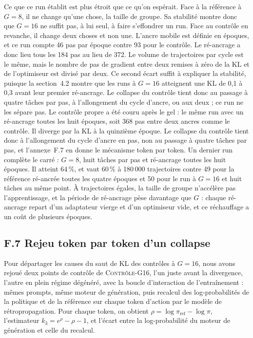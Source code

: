 \documentclass[11pt,a4paper]{article}
\begin{document}
Ce que ce run établit est plus étroit que ce qu'on espérait. Face à la référence à $G=8$, il ne change qu'une chose, la taille de groupe. Sa stabilité montre donc que $G=16$ ne suffit pas, à lui seul, à faire s'effondrer un run. Face au contrôle en revanche, il change deux choses et non une. L'ancre mobile est définie en époques, et ce run compte 46 pas par époque contre 93 pour le contrôle. Le ré-ancrage a donc lieu tous les 184 pas au lieu de 372. Le volume de trajectoires par cycle est le même, mais le nombre de pas de gradient entre deux remises à zéro de la KL et de l'optimiseur est divisé par deux. Ce second écart suffit à expliquer la stabilité, puisque la section~4.2 montre que les runs à $G=16$ atteignent une KL de 0{,}1 à 0{,}3 avant leur premier ré-ancrage. Le collapse du contrôle tient donc au passage à quatre tâches par pas, à l'allongement du cycle d'ancre, ou aux deux ; ce run ne les sépare pas. Le contrôle propre a été couru après le gel : le même run avec un ré-ancrage toutes les huit époques, soit 368 pas entre deux ancres comme le contrôle. Il diverge par la KL à la quinzième époque. Le collapse du contrôle tient donc à l'allongement du cycle d'ancre en pas, non au passage à quatre tâches par pas, et l'annexe~F.7 en donne le mécanisme token par token. Un dernier run complète le carré : $G=8$, huit tâches par pas et ré-ancrage toutes les huit époques. Il atteint 64\,\%, et vaut 60\,\% à 180\,000 trajectoires contre 49 pour la référence ré-ancrée toutes les quatre époques et 50 pour le run à $G=16$ et huit tâches au même point. À trajectoires égales, la taille de groupe n'accélère pas l'apprentissage, et la période de ré-ancrage pèse davantage que $G$ : chaque ré-ancrage repart d'un adaptateur vierge et d'un optimiseur vide, et ce réchauffage a un coût de plusieurs époques.



\subsection*{F.7 Rejeu token par token d'un collapse}

Pour départager les causes du saut de KL des contrôles à $G=16$, nous avons rejoué deux points de contrôle de \textsc{Contrôle-G16}, l'un juste avant la divergence, l'autre en plein régime dégénéré, avec la boucle d'interaction de l'entraînement : mêmes prompts, même moteur de génération, puis recalcul des log-probabilités de la politique et de la référence sur chaque token d'action par le modèle de rétropropagation. Pour chaque token, on obtient $\rho = \log \pi_{\mathrm{ref}} - \log \pi$, l'estimateur $k_3 = e^{\rho} - \rho - 1$, et l'écart entre la log-probabilité du moteur de génération et celle du recalcul.
\end{document}
